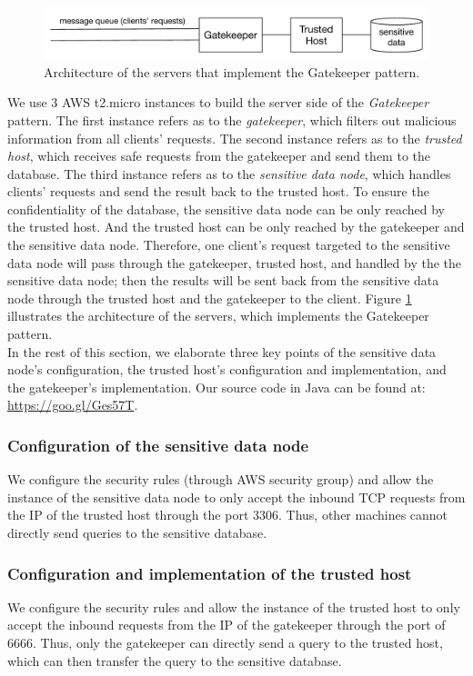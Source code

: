 \documentclass{article}
\begin{document}
\begin{figure}[t]
    \centering
        \includegraphics[width = \columnwidth]{images/gatekeeper.pdf}
    \caption{Architecture of the servers that implement the Gatekeeper pattern.}
    \label{fig:arch2}
\end{figure}

We use 3 AWS t2.micro instances to build the server side of the \emph{Gatekeeper} pattern. The first instance refers as to the \emph{gatekeeper}, which filters out malicious information from all clients' requests. The second instance refers as to the \emph{trusted host}, which receives safe requests from the gatekeeper and send them to the database. The third instance refers as to the \emph{sensitive data node}, which handles clients' requests and send the result back to the trusted host. To ensure the confidentiality of the database, the sensitive data node can be only reached by the trusted host. And the trusted host can be only reached by the gatekeeper and the sensitive data node. Therefore, one client's request targeted to the sensitive data node will pass through the gatekeeper, trusted host, and handled by the the sensitive data node; then the results will be sent back from the sensitive data node through the trusted host and the gatekeeper to the client. Figure \ref{fig:arch2} illustrates the architecture of the servers, which implements the Gatekeeper pattern.\\

In the rest of this section, we elaborate three key points of the sensitive data node's configuration, the trusted host's configuration and implementation, and the gatekeeper's implementation. Our source code in Java can be found at: \url{https://goo.gl/Ges57T}.

\subsubsection{Configuration of the sensitive data node}
We configure the security rules (through AWS security group) and allow the instance of the sensitive data node to only accept the inbound TCP requests from the IP of the trusted host through the port 3306. Thus, other machines cannot directly send queries to the sensitive database.

\subsubsection{Configuration and implementation of the trusted host}
We configure the security rules and allow the instance of the trusted host to only accept the inbound requests from the IP of the gatekeeper through the port of 6666. Thus, only the gatekeeper can directly send a query to the trusted host, which can then transfer the query to the sensitive database.\\
\end{document}
